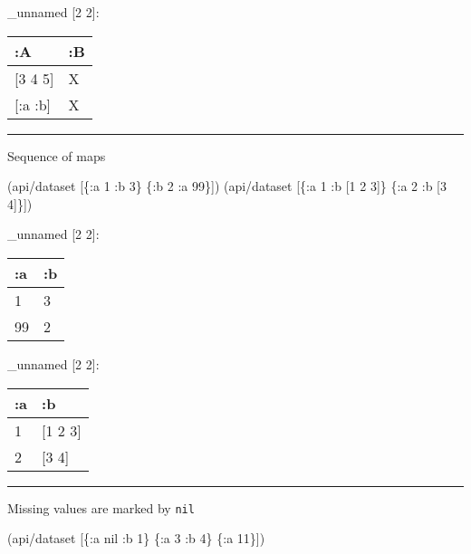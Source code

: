 \documentclass[]{article}
\newenvironment{Shaded}{\begin{snugshade}}{\end{snugshade}}
\newcommand{\DecValTok}[1]{\textcolor[rgb]{0.00,0.00,0.81}{#1}}
\newcommand{\VariableTok}[1]{\textcolor[rgb]{0.00,0.00,0.00}{#1}}
\newcommand{\AttributeTok}[1]{\textcolor[rgb]{0.77,0.63,0.00}{#1}}
\newcommand{\NormalTok}[1]{#1}
\begin{document}
\_unnamed {[}2 2{]}:

\begin{longtable}[]{@{}ll@{}}
\toprule
:A & :B\tabularnewline
\midrule
\endhead
{[}3 4 5{]} & X\tabularnewline
{[}:a :b{]} & X\tabularnewline
\bottomrule
\end{longtable}

\begin{center}\rule{0.5\linewidth}{0.5pt}\end{center}

Sequence of maps

\begin{Shaded}
\begin{Highlighting}[]
\NormalTok{(api/dataset [\{}\AttributeTok{:a} \DecValTok{1} \AttributeTok{:b} \DecValTok{3}\NormalTok{\} \{}\AttributeTok{:b} \DecValTok{2} \AttributeTok{:a} \DecValTok{99}\NormalTok{\}])}
\NormalTok{(api/dataset [\{}\AttributeTok{:a} \DecValTok{1} \AttributeTok{:b}\NormalTok{ [}\DecValTok{1} \DecValTok{2} \DecValTok{3}\NormalTok{]\} \{}\AttributeTok{:a} \DecValTok{2} \AttributeTok{:b}\NormalTok{ [}\DecValTok{3} \DecValTok{4}\NormalTok{]\}])}
\end{Highlighting}
\end{Shaded}

\_unnamed {[}2 2{]}:

\begin{longtable}[]{@{}ll@{}}
\toprule
:a & :b\tabularnewline
\midrule
\endhead
1 & 3\tabularnewline
99 & 2\tabularnewline
\bottomrule
\end{longtable}

\_unnamed {[}2 2{]}:

\begin{longtable}[]{@{}ll@{}}
\toprule
:a & :b\tabularnewline
\midrule
\endhead
1 & {[}1 2 3{]}\tabularnewline
2 & {[}3 4{]}\tabularnewline
\bottomrule
\end{longtable}

\begin{center}\rule{0.5\linewidth}{0.5pt}\end{center}

Missing values are marked by \texttt{nil}

\begin{Shaded}
\begin{Highlighting}[]
\NormalTok{(api/dataset [\{}\AttributeTok{:a} \VariableTok{nil} \AttributeTok{:b} \DecValTok{1}\NormalTok{\} \{}\AttributeTok{:a} \DecValTok{3} \AttributeTok{:b} \DecValTok{4}\NormalTok{\} \{}\AttributeTok{:a} \DecValTok{11}\NormalTok{\}])}
\end{Highlighting}
\end{Shaded}
\end{document}
